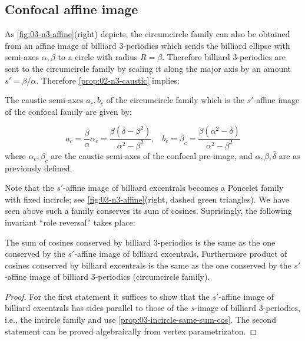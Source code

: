 \subsection{Confocal affine image} As \cref{fig:03-n3-affine}(right) depicts, the circumcircle family can also be obtained from an affine image of billiard 3-periodics which sends the billiard ellipse with semi-axes $\alpha,\beta$ to a circle with radius $R=\beta$. Therefore billiard 3-periodics are sent to the circumcircle family by scaling it along the major axis by an amount $s'={\beta/\alpha}$. Therefore \cref{prop:02-n3-caustic} implies:

\begin{lemma}
The caustic semi-axes $a_c,b_c$ of the circumcircle family which is the $s'$-affine image of the confocal family are given by:

\[ a_c=\frac{\beta}{\alpha}{\alpha_c}=\frac{\beta(\bar{\delta}-\beta^2)}{\alpha^2-\beta^2},\;\;\;b_c=\beta_c=\frac{\beta(\alpha^2-\bar{\delta})}{\alpha^2-\beta^2} \]
where $\alpha_c,\beta_c$ are the caustic semi-axes of the confocal pre-image, and $\alpha,\beta,\bar{\delta}$ are as previously defined.
\label{lem:03-circumcircle-affine}
\end{lemma}

\noindent Note that the $s'$-affine image of billiard excentrals becomes a Poncelet family with fixed incircle; see \cref{fig:03-n3-affine}(right, dashed green triangles). We have seen above such a family conserves its sum of cosines. Suprisingly, the following invariant ``role reversal'' takes place:

\begin{proposition}
The sum of cosines conserved by billiard 3-periodics is the same as the one conserved by the $s'$-affine image of billiard excentrals. Furthermore product of cosines conserved by billiard excentrals is the same as the one conserved by the $s'$-affine image of billiard 3-periodics (circumcircle family).   \label{prop:03-n3-role-reversal}
\end{proposition}

\begin{proof}
For the first statement it suffices to show that the $s'$-affine image of billiard excentrals has sides parallel to those of the $s$-image of billiard 3-periodics, i.e., the incircle family and use \cref{prop:03-incircle-same-sum-cos}. The second statement can be proved algebraically from vertex parametrizaton.
\end{proof}

